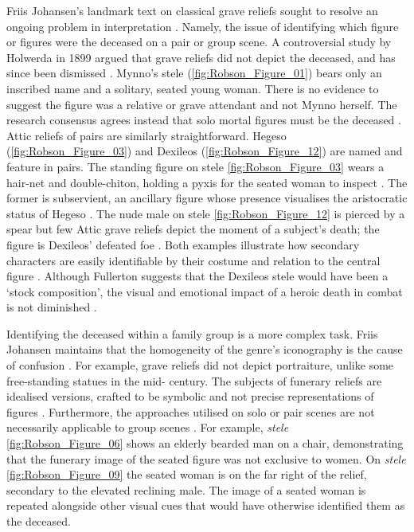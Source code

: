 Friis Johansen’s landmark text on classical grave reliefs sought to resolve an ongoing problem in interpretation \parencite[53]{Friis1951}.
Namely, the issue of identifying which figure or figures were the deceased on a pair or group scene. A controversial study by Holwerda in 1899 argued that grave reliefs did not depict the deceased, and has since been dismissed \parencite{Holwerda1899}.
Mynno’s stele (\ref{fig:Robson_Figure_01}) bears only an inscribed name and a solitary, seated young woman.
There is no evidence to suggest the figure was a relative or grave attendant and not Mynno herself. The research consensus agrees instead that solo mortal figures must be the deceased \parencite[119]{Stears1995}.
Attic reliefs of pairs are similarly straightforward. Hegeso (\ref{fig:Robson_Figure_03}) and Dexileos (\ref{fig:Robson_Figure_12}) are named and feature in pairs.
The standing figure on stele \ref{fig:Robson_Figure_03} wears a hair-net and double-chiton, holding a pyxis for the seated woman to inspect \parencite[292]{Barker1924}.
The former is subservient, an ancillary figure whose presence visualises the aristocratic status of Hegeso \parencite[689]{Leader1997}.
The nude male on stele \ref{fig:Robson_Figure_12} is pierced by a spear but few Attic grave reliefs depict the moment of a subject’s death; the figure is Dexileos’ defeated foe \parencite[57]{Hurwit2007}.
Both examples illustrate how secondary characters are easily identifiable by their costume and relation to the central figure \parencite[53]{Friis1951}.
Although Fullerton suggests that the Dexileos stele would have been a \enquote*{stock composition}, the visual and emotional impact of a heroic death in combat is not diminished \parencite[549]{Fullerton2016}.

Identifying the deceased within a family group is a more complex task. Friis Johansen maintains that the homogeneity of the genre’s iconography is the cause of confusion \parencite[55]{Friis1951}.
For example, grave reliefs did not depict portraiture, unlike some free-standing statues in the mid- century. The subjects of funerary reliefs are idealised versions, crafted to be symbolic and not precise representations of figures \parencite[313]{Grossman2007}.
Furthermore, the approaches utilised on solo or pair scenes are not necessarily applicable to group scenes \parencite[62]{Vonrodenwaldt1923}.
For example, \textit{stele} \ref{fig:Robson_Figure_06} shows an elderly bearded man on a chair, demonstrating that the funerary image of the seated figure was not exclusive to women. On \textit{stele} \ref{fig:Robson_Figure_09} the seated woman is on the far right of the relief, secondary to the elevated reclining male. The image of a seated woman is repeated alongside other visual cues that would have otherwise identified them as the deceased.

